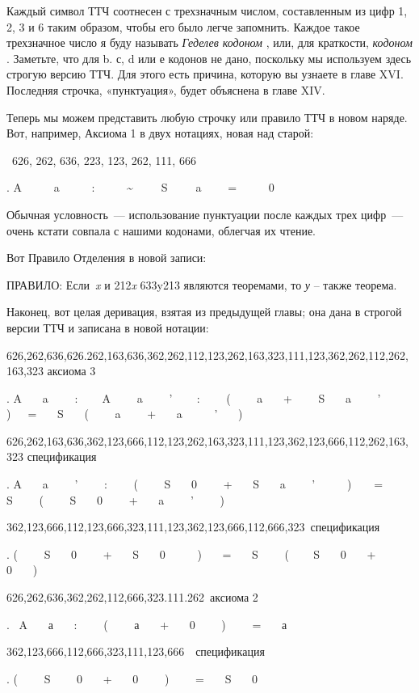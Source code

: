\documentclass[../main.tex]{subfiles}
\begin{document}
Каждый символ ТТЧ соотнесен с трехзначным числом, составленным из цифр 1, 2, 3 и 6 таким образом, чтобы его было легче запомнить. Каждое такое трехзначное число я буду называть \emph{Геделев кодоном} , или, для краткости, \emph{кодоном} . Заметьте, что для b. с, d или е кодонов не дано, поскольку мы используем здесь строгую версию ТТЧ. Для этого есть причина, которую вы узнаете в главе XVI. Последняя строчка, «пунктуация», будет объяснена в главе XIV.

Теперь мы можем представить любую строчку или правило ТТЧ в новом наряде. Вот, например, Аксиома 1 в двух нотациях, новая над старой:

~626, 262, 636, 223, 123, 262, 111, 666

. A~~~~~ a~~~~ ~:~~~~~ \textasciitilde~~~~~S~~~~~a~~~~ =~~~~~ 0

Обычная условность~--- использование пунктуации после каждых трех цифр~--- очень кстати совпала с нашими кодонами, облегчая их чтение.

Вот Правило Отделения в новой записи:

ПРАВИЛО: Если~\emph{x} и 212\emph{x} 633y213 являются теоремами, то \emph{у} \--- также теорема.

Наконец, вот целая деривация, взятая из предыдущей главы; она дана в строгой версии ТТЧ и записана в новой нотации:

626,262,636,626.262,163,636,362,262,112,123,262,163,323,111,123,362,262,112,262,163,323 аксиома 3

. A~~~ a~~~~ :~ ~~ A~~~ ~a~~~~ '~~ ~ :~~~~ (~~~ ~a~~~ +~~~~ S~~~ a~~~~ '~~~~ )~~~=~~~ S~~~ (~~~~ a~~~~ +~~~ a~~~~~ '~~~ )

626,262,163,636,362,123,666,112,123,262,163,323,111,123,362,123,666,112,262,163,323 спецификация

. A~~~ a~~~~ '~~~~ :~~~~ (~~~~ S~~ ~0~~~~ +~~~ S~~~ a~~~~ '~~~~~ )~~~~=~~~ S~~~~ (~~~~ S~~~ 0~~~~ +~~~ a~~~~ '~~~~ )

362,123,666,112,123,666,323,111,123,362,123,666,112,666,323~спецификация

. (~~~~ S~~~ 0~~~~ +~~~ S~~~ 0~~~~~ )~~~ =~~~ S~~~~ ( ~~~ S~~~ 0~~~ +~~~~ 0~~~ )

626,262,636,362,262,112,666,323.111.262~аксиома 2

.~ A~~~ а~~ ~:~~~~ (~~~~ а~~~ +~~~ 0~~~ ~)~~~~ =~~~ а

362,123,666,112,666,323,111,123,666~~спецификация

. (~~~~ S~~~~ 0~~~ +~~ ~0~~~~ )~~~~ =~~~ S~~~ 0
\end{document}
